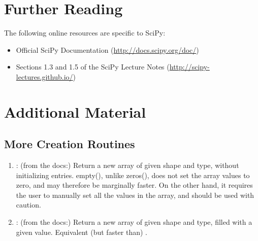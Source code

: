\section*{Further Reading}
The following online resources are specific to SciPy:
\begin{itemize}
\item Official SciPy Documentation (\url{http://docs.scipy.org/doc/})
\item Sections 1.3 and 1.5 of the SciPy Lecture Notes (\url{http://scipy-lectures.github.io/})
\end{itemize}

\newpage

\section*{Additional Material}

\subsection*{More Creation Routines}

\begin{enumerate}
\item {}: (from the docs:) Return a new array of given shape and type, without initializing entries. empty(), unlike zeros(), does not set the array values to zero, and may therefore be marginally faster. On the other hand, it requires the user to manually set all the values in the array, and should be used with caution.
\item {}: (from the docs:) Return a new array of given shape and type, filled with a given value. Equivalent (but faster than) .
\end{enumerate}
